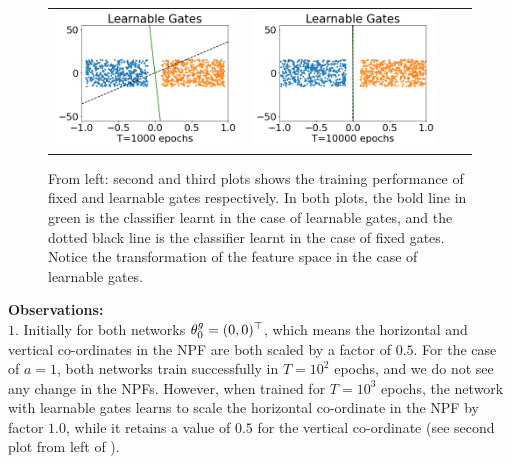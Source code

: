 \begin{figure}[!t]
\begin{minipage}{1\columnwidth}
{\begin{tabular}{cccc}
\includegraphics[scale=0.2]{figs/learn-1e3-ae100.png}
&
\includegraphics[scale=0.2]{figs/learn-1e4-ae100.png}
\end{tabular}
}
\end{minipage}

\caption{From left: second and third plots shows the training performance of fixed and learnable gates respectively. In both plots, the bold line in green is the classifier learnt in the case of learnable gates, and the dotted black line is the classifier learnt in the case of fixed gates. Notice the transformation of the feature space in the case of learnable gates.}
\label{fig:feat}
\end{figure}
\textbf{Observations:}\\
$1.$ Initially for both networks $\theta^g_0=(0,0)^\top$, which means the horizontal and vertical co-ordinates in the NPF are both scaled by a factor of $0.5$. For the case of $a=1$, both networks train successfully in $T=10^2$ epochs, and we do not see any change in the NPFs. However, when trained for $T=10^3$ epochs, the network with learnable gates learns to scale the horizontal co-ordinate in the NPF by factor $1.0$, while it retains a value of $0.5$ for the vertical co-ordinate (see second plot from left of ).\\
